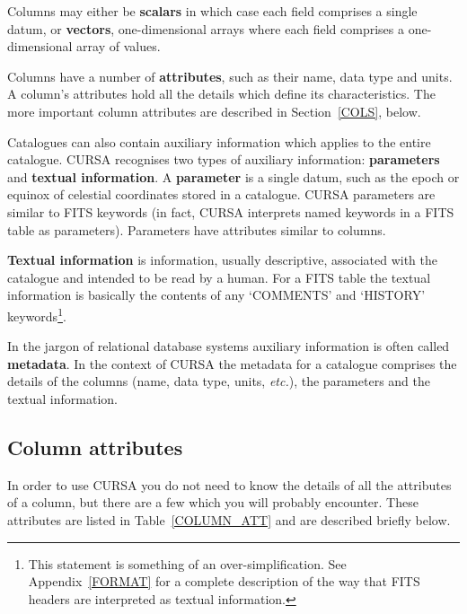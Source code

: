 \documentclass[twoside,11pt]{article}
\renewcommand{\_}{\texttt{\symbol{95}}}
\begin{document}
Columns may either be {\bf scalars} in which case each field comprises
a single datum, or {\bf vectors}, one-dimensional arrays where each
field comprises a one-dimensional array of values.

Columns have a number of {\bf attributes}, such as their name, data type
and units. A column's attributes hold all the details which define its
characteristics.  The more important column attributes are described
in Section~\ref{COLS}, below.

Catalogues can also contain auxiliary information which applies to the
entire catalogue. CURSA recognises two types of auxiliary information:
{\bf parameters} and {\bf textual information}. A {\bf parameter} is
a single datum, such as the epoch or equinox of celestial coordinates stored 
in a catalogue. CURSA parameters are similar to FITS keywords (in
fact, CURSA interprets named keywords in a FITS table as parameters). 
Parameters have attributes similar to columns.

{\bf Textual information} is information, usually descriptive,
associated with the catalogue and intended to be read by a human. For a
FITS table the textual information is basically the contents of any
`COMMENTS' and `HISTORY' keywords\footnote{This statement is something
of an over-simplification. See Appendix~\ref{FORMAT} for a complete
description of the way that FITS headers are interpreted as textual
information.}.

In the jargon of relational database systems auxiliary information is
often called {\bf metadata}.  In the context of CURSA the metadata for
a catalogue comprises the details of the columns (name, data type,
units, \emph{etc.}), the parameters and the textual information.


\subsection{\label{COLS}Column attributes}

In order to use CURSA you do not need to know the details of all the
attributes of a column, but there are a few which you will probably
encounter. These attributes are listed in Table~\ref{COLUMN_ATT} and are
described briefly below.
\end{document}
